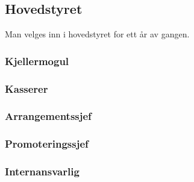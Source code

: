 \documentclass[10pt,norsk,a4paper]{article}
\begin{document}
\begin{minipage}[t]{9cm}
\subsection{Hovedstyret}
Man velges inn i hovedstyret for ett år av gangen.

\subsubsection{Kjellermogul}
\subsubsection{Kasserer}
\subsubsection{Arrangementssjef}
\subsubsection{Promoteringssjef}
\subsubsection{Internansvarlig}

\end{minipage}
\end{document}
